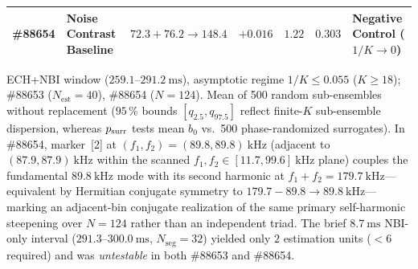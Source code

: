 \begin{table}[H]
\begin{tabular}{@{}l >{\raggedright\arraybackslash}m{3.00cm} >{\centering\arraybackslash}m{3.32cm} c c c >{\raggedright\arraybackslash}m{3.68cm}@{}}
\#88654 & Noise Contrast Baseline & $72.3 + 76.2 \to 148.4$ & $+0.016$ & $1.22$ & $0.303$ & Negative Control ($1/K \to 0$) \\
\bottomrule
\end{tabular}
\par\vspace{2pt}\noindent\parbox{\textwidth}{\footnotesize ECH+NBI window ($259.1\text{--}291.2~\mathrm{ms}$), asymptotic regime $1/K \le 0.055$ ($K \ge 18$); \#88653 ($N_{\mathrm{est}}=40$), \#88654 ($N=124$). Mean of 500 random sub-ensembles without replacement ($95\,\%$ bounds $[q_{2.5}, q_{97.5}]$ reflect finite-$K$ sub-ensemble dispersion, whereas $p_{\rm surr}$ tests mean $b_0$ vs.\ 500 phase-randomized surrogates). In \#88654, marker~[2] at $(f_1, f_2) = (89.8, 89.8)~\mathrm{kHz}$ (adjacent to $(87.9, 87.9)~\mathrm{kHz}$ within the scanned $f_1, f_2 \in [11.7, 99.6]~\mathrm{kHz}$ plane) couples the fundamental $89.8~\mathrm{kHz}$ mode with its second harmonic at $f_1 + f_2 = 179.7~\mathrm{kHz}$---equivalent by Hermitian conjugate symmetry to $179.7 - 89.8 \to 89.8~\mathrm{kHz}$---marking an adjacent-bin conjugate realization of the same primary self-harmonic steepening over $N=124$ rather than an independent triad. The brief $8.7~\mathrm{ms}$ NBI-only interval ($291.3\text{--}300.0~\mathrm{ms}$, $N_{\mathrm{seg}}=32$) yielded only $2$ estimation units ($<6$ required) and was \emph{untestable} in both \#88653 and \#88654.}
\end{table}
